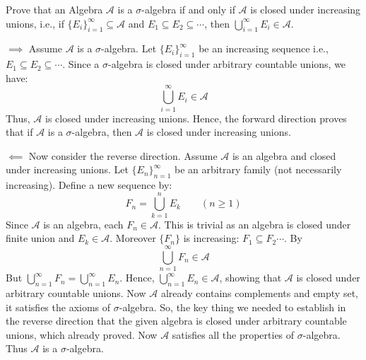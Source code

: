 \begin{problem}

Prove that an Algebra $\mathcal{A}$ is a $\sigma$-algebra if and only if $\mathcal{A}$ is closed under increasing unions, i.e., if $\{E_i\}_{i=1}^\infty\subseteq \mathcal{A}$ and $E_1\subseteq E_2\subseteq\cdots$, then $\bigcup_{i=1}^\infty E_i\in\mathcal{A}$.  
\end{problem}
\begin{solution}
$\implies$ Assume $\mathcal{A}$ is a $\sigma$-algebra. Let $\{E_i\}_{i=1}^\infty$ be an increasing sequence i.e., $E_1\subseteq E_2\subseteq\cdots$. Since a $\sigma$-algebra is closed under arbitrary countable unions, we have:
\[
\bigcup_{i=1}^\infty E_i\in\mathcal{A}
\]
Thus, $\mathcal{A}$ is closed under increasing unions. 
Hence, the forward direction proves that if $\mathcal{A}$ is a $\sigma$-algebra, then $\mathcal{A}$ is closed under increasing unions. 

$\impliedby$
Now consider the reverse direction. Assume $\mathcal{A}$ is an algebra and closed under increasing unions. Let $\{E_n\}_{n=1}^\infty$ be an arbitrary family (not necessarily increasing). Define a new sequence by:
\[
F_n=\bigcup_{k=1}^n E_k \qquad (n\ge 1)
\]
Since $\mathcal{A}$ is an algebra, each $F_n\in\mathcal{A}$. This is trivial as an algebra is closed under finite union and $E_k\in \mathcal{A}$. Moreover $\{F_n\}$ is increasing: $F_1\subseteq F_2\cdots$. By 
\[
\bigcup_{n=1}^\infty F_n\in \mathcal{A}
\]
But $\bigcup_{n=1}^\infty F_n=\bigcup_{n=1}^\infty E_n$. Hence, $\bigcup_{n=1}^\infty E_n \in \mathcal{A}$, showing that $\mathcal{A}$ is closed under arbitrary countable unions. Now $\mathcal{A}$ already contains complements and empty set, it satisfies the axioms of $\sigma$-algebra. So, the key thing we needed to establish in the reverse direction that the given algebra is closed under arbitrary countable unions, which already proved. Now $\mathcal{A}$ satisfies all the properties of $\sigma$-algebra.\newline
Thus $\mathcal{A}$ is a $\sigma$-algebra.
\end{solution}
